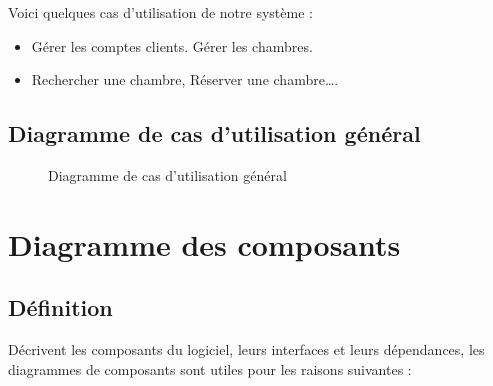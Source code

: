 \documentclass[12pt]{report}
\begin{document}
Voici quelques cas d’utilisation de notre système :

\begin{itemize}
    \item Gérer les comptes clients. Gérer les chambres.
    \item Rechercher une chambre, Réserver une chambre….
\end{itemize}


\subsection{Diagramme de cas d’utilisation général}

\vspace{0.1in}

\begin{figure}[h]
\centering
  \vspace{-0.1in}
    \centerline{}
    \caption{Diagramme de cas d’utilisation général}
\end{figure}

\newpage

\section{Diagramme des composants}
\subsection{Définition}
\hspace*{0.16in}
Décrivent les composants du logiciel, leurs interfaces et leurs dépendances, les diagrammes de composants sont utiles pour les raisons suivantes :
\end{document}
